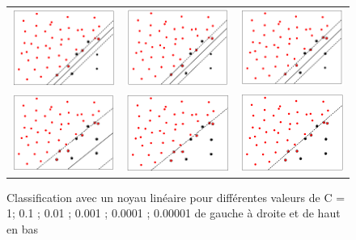 \documentclass[10pt,a4paper]{article}
\begin{document}
\begin{figure}[H]
\begin{tabular}{ccc}
\includegraphics[width=0.33\linewidth]{images/libC1.png} & \includegraphics[width=0.33\linewidth]{images/libC0_1.png} & \includegraphics[width=0.33\linewidth]{images/libC0_01.png} \\ 

\includegraphics[width=0.33\linewidth]{images/libC0_001.png} & \includegraphics[width=0.33\linewidth]{images/libC0_0001.png} & \includegraphics[width=0.33\linewidth]{images/libC0_00001.png} \\ 
\end{tabular} 
\caption{Classification avec un noyau linéaire pour différentes valeurs de C = 1; 0.1 ; 0.01 ; 0.001 ; 0.0001 ; 0.00001 de gauche à droite et de haut en bas}
\end{figure}
\end{document}
